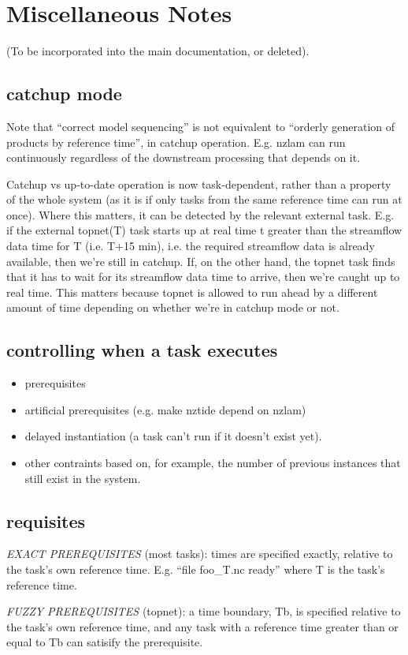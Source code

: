 \documentclass[a4paper,12pt]{amsart}
\begin{document}
\section{Miscellaneous Notes}

(To be incorporated into the main documentation, or deleted).

\subsection{catchup mode}

Note that ``correct model sequencing'' is not equivalent to ``orderly
generation of products by reference time'', in catchup operation.  E.g.
nzlam can run continuously regardless of the downstream processing that
depends on it.

Catchup vs up-to-date operation is now task-dependent, rather than a
property of the whole system (as it is if only tasks from the same
reference time can run at once).  Where this matters, it can be detected
by the relevant external task. E.g. if the external topnet(T) task
starts up at real time t greater than the streamflow data time for T
(i.e. T+15 min), i.e. the required streamflow data is already available,
then we're still in catchup. If, on the other hand, the topnet task
finds that it has to wait for its streamflow data time to arrive, then
we're caught up to real time.  This matters because topnet is allowed to
run ahead by a different amount of time depending on whether we're in
catchup mode or not.


\subsection{controlling when a task executes}

\begin{itemize}
 \item  prerequisites
 \item artificial prerequisites (e.g. make nztide depend on nzlam)
 \item delayed instantiation (a task can't run if it doesn't exist yet).
 \item other contraints based on, for example, the number of previous
 instances that still exist in the system.
\end{itemize}


\subsection{requisites}

{\em EXACT PREREQUISITES} (most tasks): times are specified exactly,
relative to the task's own reference time.  E.g. ``file foo\_{T}.nc
ready'' where T is the task's reference time.

{\em FUZZY PREREQUISITES} (topnet): a time boundary, Tb, is specified
relative to the task's own reference time, and any task with a reference
time greater than or equal to Tb can satisify the prerequisite.
\end{document}
